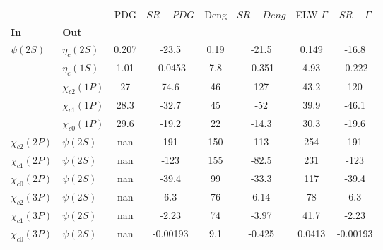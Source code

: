 \begin{tabular}{l|l|c|c|c|c|c|c}
\toprule
                &            &   PDG & $SR-PDG$ &  Deng & $SR-Deng$ &  ELW-$\Gamma$ & $SR-\Gamma$ \\
\textbf{In} & \textbf{Out} &       &          &       &           &               &             \\
\midrule
\textbf{$\psi(2S)$} & \textbf{$\eta_{c}(2S)$} & 0.207 &    -23.5 &  0.19 &     -21.5 &         0.149 &       -16.8 \\
                & \textbf{$\eta_{c}(1S)$} &  1.01 &  -0.0453 &   7.8 &    -0.351 &          4.93 &      -0.222 \\
                & \textbf{$\chi_{c2}(1P)$} &    27 &     74.6 &    46 &       127 &          43.2 &         120 \\
                & \textbf{$\chi_{c1}(1P)$} &  28.3 &    -32.7 &    45 &       -52 &          39.9 &       -46.1 \\
                & \textbf{$\chi_{c0}(1P)$} &  29.6 &    -19.2 &    22 &     -14.3 &          30.3 &       -19.6 \\
\textbf{$\chi_{c2}(2P)$} & \textbf{$\psi(2S)$} &   nan &      191 &   150 &       113 &           254 &         191 \\
\textbf{$\chi_{c1}(2P)$} & \textbf{$\psi(2S)$} &   nan &     -123 &   155 &     -82.5 &           231 &        -123 \\
\textbf{$\chi_{c0}(2P)$} & \textbf{$\psi(2S)$} &   nan &    -39.4 &    99 &     -33.3 &           117 &       -39.4 \\
\textbf{$\chi_{c2}(3P)$} & \textbf{$\psi(2S)$} &   nan &      6.3 &    76 &      6.14 &            78 &         6.3 \\
\textbf{$\chi_{c1}(3P)$} & \textbf{$\psi(2S)$} &   nan &    -2.23 &    74 &     -3.97 &          41.7 &       -2.23 \\
\textbf{$\chi_{c0}(3P)$} & \textbf{$\psi(2S)$} &   nan & -0.00193 &   9.1 &    -0.425 &        0.0413 &    -0.00193 \\
\bottomrule
\end{tabular}
